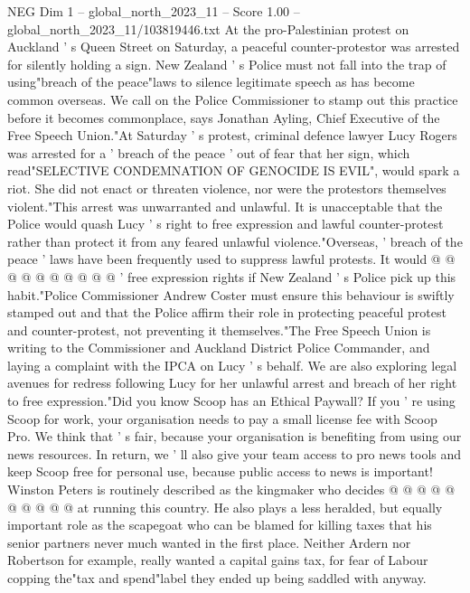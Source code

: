 \begin{textsample}{NEG Dim 1 – global\_north\_2023\_11 – Score 1.00 – global\_north\_2023\_11/103819446.txt}  \label{ex:f1_neg_194}
At the pro-Palestinian protest on Auckland ' s Queen Street on Saturday, a peaceful counter-protestor was arrested for silently holding a sign.
New Zealand ' s Police must not fall into the trap of using"breach of the peace"laws to silence legitimate speech as has become common overseas.
We call on the Police Commissioner to stamp out this practice before it becomes commonplace, says Jonathan Ayling, Chief Executive of the Free Speech Union."At Saturday ' s protest, criminal defence lawyer Lucy Rogers was arrested for a ' breach of the peace ' out of fear that her sign, which read"SELECTIVE CONDEMNATION OF GENOCIDE IS EVIL", would spark a riot.
She did not enact or threaten violence, nor were the protestors themselves violent."This arrest was unwarranted and unlawful.
It is unacceptable that the Police would quash Lucy ' s right to free expression and lawful counter-protest rather than protect it from any feared unlawful violence."Overseas, ' breach of the peace ' laws have been frequently used to suppress lawful protests.
It would @ @ @ @ @ @ @ @ @ @ ' free expression rights if New Zealand ' s Police pick up this habit."Police Commissioner Andrew Coster must ensure this behaviour is swiftly stamped out and that the Police affirm their role in protecting peaceful protest and counter-protest, not preventing it themselves."The Free Speech Union is writing to the Commissioner and Auckland District Police Commander, and laying a complaint with the IPCA on Lucy ' s behalf.
We are also exploring legal avenues for redress following Lucy for her unlawful arrest and breach of her right to free expression."Did you know Scoop has an Ethical Paywall?
If you ' re using Scoop for work, your organisation needs to pay a small license fee with Scoop Pro.
We think that ' s fair, because your organisation is benefiting from using our news resources.
In return, we ' ll also give your team access to pro news tools and keep Scoop free for personal use, because public access to news is important!
Winston Peters is routinely described as the kingmaker who decides @ @ @ @ @ @ @ @ @ @ at running this country.
He also plays a less heralded, but equally important role as the scapegoat who can be blamed for killing taxes that his senior partners never much wanted in the first place.
Neither Ardern nor Robertson for example, really wanted a capital gains tax, for fear of Labour copping the"tax and spend"label they ended up being saddled with anyway.

\end{textsample}
